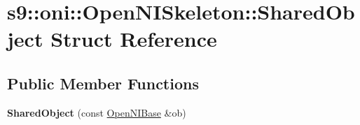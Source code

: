 \hypertarget{structs9_1_1oni_1_1OpenNISkeleton_1_1SharedObject}{\section{s9\-:\-:oni\-:\-:Open\-N\-I\-Skeleton\-:\-:Shared\-Object Struct Reference}
\label{structs9_1_1oni_1_1OpenNISkeleton_1_1SharedObject}
}
\subsection*{Public Member Functions}
\begin{DoxyCompactItemize}
\item 
\hypertarget{structs9_1_1oni_1_1OpenNISkeleton_1_1SharedObject_a281c15b434d091ebd05d21b7fd64e7d9}{{\bfseries Shared\-Object} (const \hyperlink{classs9_1_1oni_1_1OpenNIBase}{Open\-N\-I\-Base} \&ob)}\label{structs9_1_1oni_1_1OpenNISkeleton_1_1SharedObject_a281c15b434d091ebd05d21b7fd64e7d9}

\end{DoxyCompactItemize}
